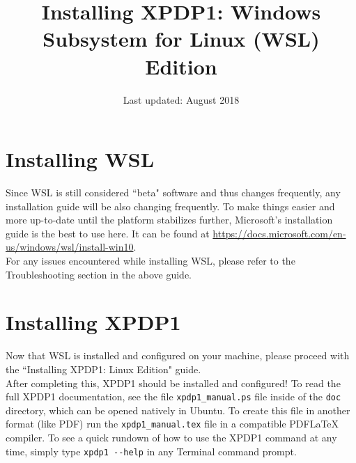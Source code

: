 \documentclass{article}
\title{Installing XPDP1: Windows Subsystem for Linux (WSL) Edition}
\author{}
\date{Last updated: August 2018}
\begin{document}
	\maketitle

	\section{Installing WSL}

	\noindent Since WSL is still considered ``beta" software and thus changes frequently, any installation guide will be also changing frequently. To make things easier and more up-to-date until the platform stabilizes further, Microsoft's installation guide is the best to use here. It can be found at \url{https://docs.microsoft.com/en-us/windows/wsl/install-win10}. \\
	
	\noindent For any issues encountered while installing WSL, please refer to the Troubleshooting section in the above guide. 

	\section{Installing XPDP1}

	\noindent Now that WSL is installed and configured on your machine, please proceed with the ``Installing XPDP1: Linux Edition" guide. \\

	\noindent After completing this, XPDP1 should be installed and configured! To read the full XPDP1 documentation, see the file \verb|xpdp1_manual.ps| file inside of the \verb|doc| directory, which can be opened natively in Ubuntu. To create this file in another format (like PDF) run the \verb|xpdp1_manual.tex| file in a compatible PDF\LaTeX \hspace{1pt} compiler. To see a quick rundown of how to use the XPDP1 command at any time, simply type \verb|xpdp1 --help| in any Terminal command prompt.
\end{document}
